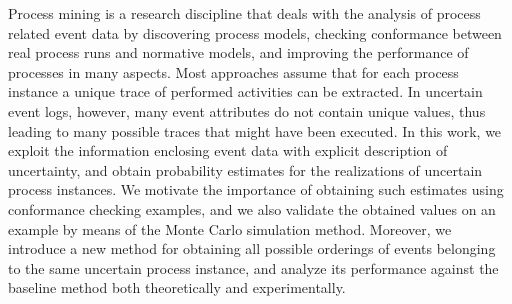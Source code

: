 Process mining is a research discipline that deals with the analysis of process related event data by discovering process models, checking conformance between real process runs and normative models, and improving the performance of processes in many aspects.
Most approaches assume that for each process instance a unique trace of performed activities can be extracted.
In uncertain event logs, however, many event attributes do not contain unique values, thus leading to many possible traces that might have been executed.
In this work, we exploit the information enclosing event data with explicit description of uncertainty, and obtain probability estimates for the realizations of uncertain process instances.
We motivate the importance of obtaining such estimates using conformance checking examples, and we also validate the obtained values on an example by means of the Monte Carlo simulation method.
Moreover, we introduce a new method for obtaining all possible orderings of events belonging to the same uncertain process instance, and analyze its performance against the baseline method both theoretically and experimentally.
 